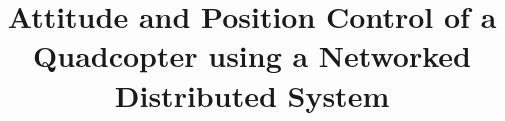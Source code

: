 







\title{Attitude and Position Control of a Quadcopter using a Networked Distributed System}

